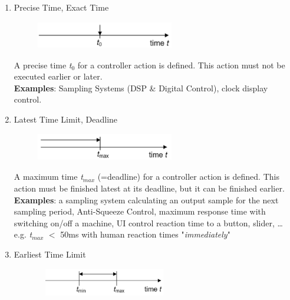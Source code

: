 \begin{enumerate}
\item Precise Time, Exact Time 
	
	\begin{figure}[h]
    \centering
    \includegraphics[width=6cm, height=1.2cm]{Images/image62.png}
    \label{fig:Fig 8}
	\end{figure} 
	
A precise time \textit{t}${}_{0}$ for a controller action is defined. This action must not be executed earlier or later.\\
\textbf{Examples}: Sampling Systems (DSP \& Digital Control),      clock display control.

\item Latest Time Limit, Deadline 

	\begin{figure}[h]
    \centering
    \includegraphics[width=6cm, height=1.2cm]{Images/image63.png}
    \label{fig:Fig 9}
    \end{figure}
    
A maximum time \textit{t}${}_{max}$ (=deadline) for a controller action is defined. This action must be finished latest at its deadline, but it can be finished earlier.\\ 
\textbf{Examples}: a sampling system calculating an output sample for the next sampling      period, Anti-Squeeze Control, maximum response time with switching      on/off a machine, UI control reaction time to a button, slider, {\dots}      e.g. \textit{t${}_{max}$} $\mathrm{<}$ 50ms with human reaction times  "\textit{immediately}"    

\item Earliest Time Limit 
	
	\begin{figure}[h]
    \centering
    \includegraphics[width=6cm, height=1.2cm]{Images/image64.png}
    \label{fig:Fig 10}
    \end{figure}
    

\end{enumerate}
